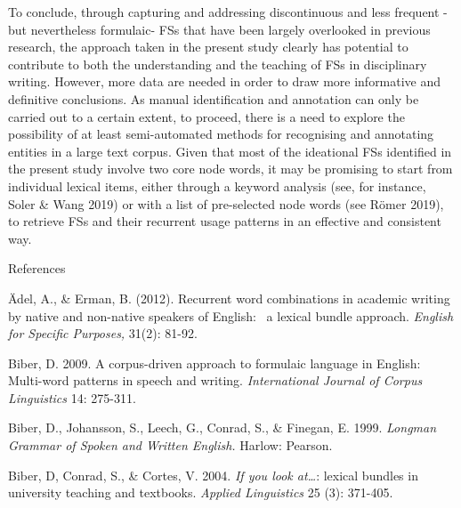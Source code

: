 \begin{styleStandard}
To conclude, through capturing and addressing discontinuous and less frequent - but nevertheless formulaic- FSs that have been largely overlooked in previous research, the approach taken in the present study clearly has potential to contribute to both the understanding and the teaching of FSs in disciplinary writing. However, more data are needed in order to draw more informative and definitive conclusions. As manual identification and annotation can only be carried out to a certain extent, to proceed, there is a need to explore the possibility of at least semi-automated methods for recognising and annotating entities in a large text corpus. Given that most of the ideational FSs identified in the present study involve two core node words, it may be promising to start from individual lexical items, either through a keyword analysis (see, for instance, Soler \& Wang 2019) or with a list of pre-selected node words (see Römer 2019), to retrieve FSs and their recurrent usage patterns in an effective and consistent way.
\end{styleStandard}

\begin{listWWNumxivleveli}
\item 
\begin{stylelsSectioni}
References
\end{stylelsSectioni}
\end{listWWNumxivleveli}
\begin{styleStandard}
Ädel, A., \& Erman, B. (2012). Recurrent word combinations in academic writing by native and non-native speakers of English: \ a lexical bundle approach. \textit{English for Specific Purposes, }31(2): 81-92.
\end{styleStandard}

\begin{styleStandard}
Biber, D. 2009. A corpus-driven approach to formulaic language in English: Multi-word patterns in speech and writing. \textit{International Journal of Corpus Linguistics }14: 275-311.
\end{styleStandard}

\begin{styleStandard}
Biber, D., Johansson, S., Leech, G., Conrad, S., \& Finegan, E. 1999. \textit{Longman Grammar of Spoken and Written English. }Harlow: Pearson.
\end{styleStandard}

\begin{styleStandard}
Biber, D, Conrad, S., \& Cortes, V. 2004. \textit{If you look at…}: lexical bundles in university teaching and textbooks. \textit{Applied Linguistics }25 (3): 371-405.
\end{styleStandard}

